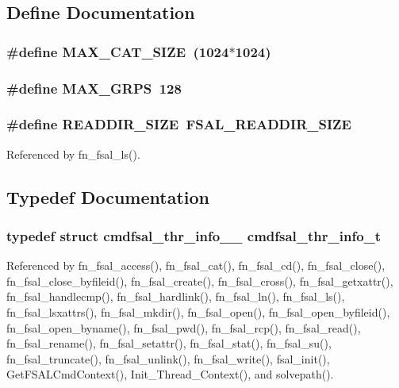 \subsection{Define Documentation}
\subsubsection{\setlength{\rightskip}{0pt plus 5cm}\#define MAX\_\-CAT\_\-SIZE\ (1024$\ast$1024)}\label{commands__FSAL_8c_a2}


\subsubsection{\setlength{\rightskip}{0pt plus 5cm}\#define MAX\_\-GRPS\ 128}\label{commands__FSAL_8c_a1}


\subsubsection{\setlength{\rightskip}{0pt plus 5cm}\#define READDIR\_\-SIZE\ FSAL\_\-READDIR\_\-SIZE}\label{commands__FSAL_8c_a0}




Referenced by fn\_\-fsal\_\-ls().

\subsection{Typedef Documentation}
\subsubsection{\setlength{\rightskip}{0pt plus 5cm}typedef struct {\bf cmdfsal\_\-thr\_\-info\_\-\_\-}  {\bf cmdfsal\_\-thr\_\-info\_\-t}}\label{commands__FSAL_8c_a8}




Referenced by fn\_\-fsal\_\-access(), fn\_\-fsal\_\-cat(), fn\_\-fsal\_\-cd(), fn\_\-fsal\_\-close(), fn\_\-fsal\_\-close\_\-byfileid(), fn\_\-fsal\_\-create(), fn\_\-fsal\_\-cross(), fn\_\-fsal\_\-getxattr(), fn\_\-fsal\_\-handlecmp(), fn\_\-fsal\_\-hardlink(), fn\_\-fsal\_\-ln(), fn\_\-fsal\_\-ls(), fn\_\-fsal\_\-lsxattrs(), fn\_\-fsal\_\-mkdir(), fn\_\-fsal\_\-open(), fn\_\-fsal\_\-open\_\-byfileid(), fn\_\-fsal\_\-open\_\-byname(), fn\_\-fsal\_\-pwd(), fn\_\-fsal\_\-rcp(), fn\_\-fsal\_\-read(), fn\_\-fsal\_\-rename(), fn\_\-fsal\_\-setattr(), fn\_\-fsal\_\-stat(), fn\_\-fsal\_\-su(), fn\_\-fsal\_\-truncate(), fn\_\-fsal\_\-unlink(), fn\_\-fsal\_\-write(), fsal\_\-init(), Get\-FSALCmd\-Context(), Init\_\-Thread\_\-Context(), and solvepath().

